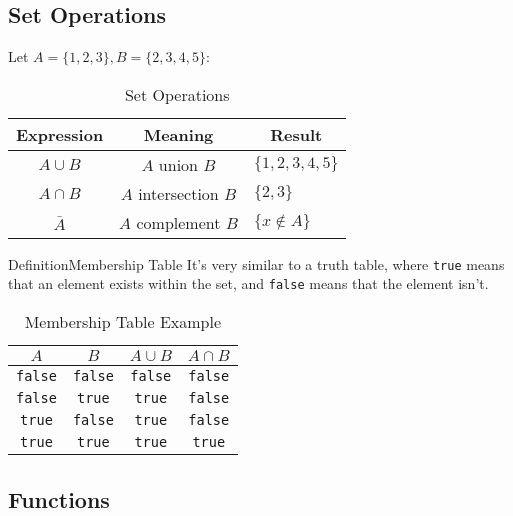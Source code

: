 \documentclass{MathNotes}
\newenvironment{definition}[1]{\begin{RedBox}{Definition}{#1}}{\end{RedBox}}
\begin{document}
\subsection{Set Operations}
Let $A=\{1,2,3\},B=\{2,3,4,5\}$:
\begin{table}[h!]
	\centering
	\caption{Set Operations}
	\begin{tabular}{ccl}
		\multicolumn{1}{c}{\textbf{Expression}} &
		\multicolumn{1}{c}{\textbf{Meaning}}    &
		\multicolumn{1}{c}{\textbf{Result}}                                               \\
		\midrule
		$A\cup B$                               & $A$ union $B$        & $\{1,2,3,4,5\}$  \\
		$A\cap B$                               & $A$ intersection $B$ & $\{2,3\}$        \\
		$\bar{A}$                               & $A$ complement $B$   & $\{x\not\in A\}$ \\
	\end{tabular}
\end{table}
\begin{definition}{Membership Table}\label{def:membership-table}
	It's very similar to a truth table, where \texttt{true} means that an element exists within the set, and \texttt{false} means that the element isn't.
\end{definition}

\begin{table}[h!]
	\centering
	\caption{Membership Table Example}
	\begin{tabular}{cc|c|c}
		$A$            & $B$            & $A\cup B$      & $A\cap B$      \\
		\midrule
		\texttt{false} & \texttt{false} & \texttt{false} & \texttt{false} \\
		\texttt{false} & \texttt{true}  & \texttt{true}  & \texttt{false} \\
		\texttt{true}  & \texttt{false} & \texttt{true}  & \texttt{false} \\
		\texttt{true}  & \texttt{true}  & \texttt{true}  & \texttt{true}
	\end{tabular}
\end{table}

\newpage
\subsection{Functions}
\end{document}
